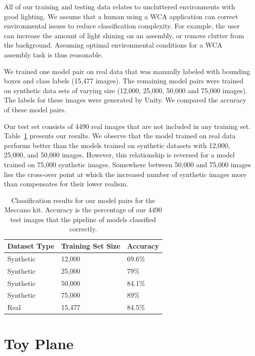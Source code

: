All of our training and testing data relates to
uncluttered environments with good lighting.  We assume that a human
using a WCA application can correct environmental issues to reduce
classification complexity.  For example, the user can increase the
amount of light shining on an assembly, or remove clutter from the
background.   Assuming optimal environmental conditions for a WCA assembly
task is thus reasonable.

We trained one model pair on real data that was manually labeled with
bounding boxes and class labels (15,477 images).
The remaining model pairs were trained on synthetic data sets of varying size
(12,000, 25,000, 50,000 and 75,000 images).
The labels for these images were generated by Unity.
We compared the accuracy of these model pairs.

Our test set consists of 4490 real images that are not included in any
training set.  Table~\ref{tab:meccano_accuracy} presents our results.  We
observe that the model trained on real data performs better than the
models trained on synthetic datasets with 12,000, 25,000, and 50,000
images.  However, this relationship is reversed for a model trained on
75,000 synthetic images.  Somewhere between 50,000 and 75,000 images
lies the cross-over point at which the increased number of synthetic
images more than compensates for their lower realism.

\begin{table}
  \centering
\begin{tabular}{|l||l|l|}
\hline
  Dataset Type & Training Set Size & Accuracy\\
  \hline
  \hline
  Synthetic & 12,000 & 69.6\%\\
  Synthetic & 25,000 & 79\%\\
  Synthetic & 50,000 & 84.1\%\\
  Synthetic & 75,000 & 89\%\\
  \hline
  Real & 15,477 & 84.5\%\\
\hline
\end{tabular}
  \caption{
    Classification results for our model pairs for the Meccano kit.
    Accuracy is the percentage of our 4490 test images that the pipeline of
    models classified correctly.
  }\label{tab:meccano_accuracy}
\end{table}

\section{Toy Plane}

